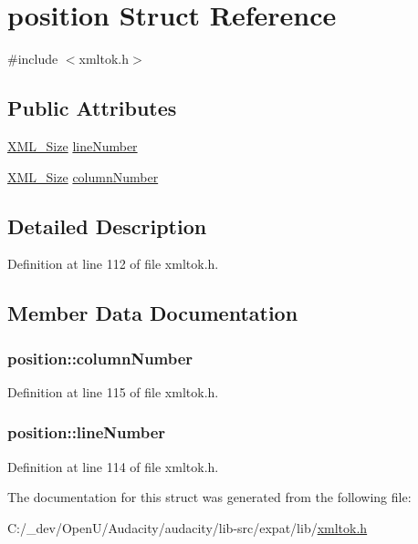 \hypertarget{structposition}{}\section{position Struct Reference}
\label{structposition}


{\ttfamily \#include $<$xmltok.\+h$>$}

\subsection*{Public Attributes}
\begin{DoxyCompactItemize}
\item 
\hyperlink{amiga_2include_2libraries_2expat_8h_ad22a225e6e62127360b44b2f7559f789}{X\+M\+L\+\_\+\+Size} \hyperlink{structposition_ab89991b9b0be0f57cf9b4f611d0dab88}{line\+Number}
\item 
\hyperlink{amiga_2include_2libraries_2expat_8h_ad22a225e6e62127360b44b2f7559f789}{X\+M\+L\+\_\+\+Size} \hyperlink{structposition_a3208bd87581c9abc5b20ee85790463b8}{column\+Number}
\end{DoxyCompactItemize}


\subsection{Detailed Description}


Definition at line 112 of file xmltok.\+h.



\subsection{Member Data Documentation}
\subsubsection[{\texorpdfstring{column\+Number}{columnNumber}}]{ position\+::column\+Number}\hypertarget{structposition_a3208bd87581c9abc5b20ee85790463b8}{}\label{structposition_a3208bd87581c9abc5b20ee85790463b8}


Definition at line 115 of file xmltok.\+h.

\subsubsection[{\texorpdfstring{line\+Number}{lineNumber}}]{ position\+::line\+Number}\hypertarget{structposition_ab89991b9b0be0f57cf9b4f611d0dab88}{}\label{structposition_ab89991b9b0be0f57cf9b4f611d0dab88}


Definition at line 114 of file xmltok.\+h.



The documentation for this struct was generated from the following file\+:\begin{DoxyCompactItemize}
\item 
C\+:/\+\_\+dev/\+Open\+U/\+Audacity/audacity/lib-\/src/expat/lib/\hyperlink{xmltok_8h}{xmltok.\+h}\end{DoxyCompactItemize}
